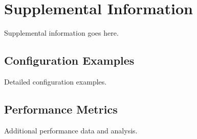 \appendix

\section{Supplemental Information}
\label{sec:appendix}

Supplemental information goes here.

\subsection{Configuration Examples}
\label{subsec:config_examples}

Detailed configuration examples.

\subsection{Performance Metrics}
\label{subsec:performance_metrics}

Additional performance data and analysis.
